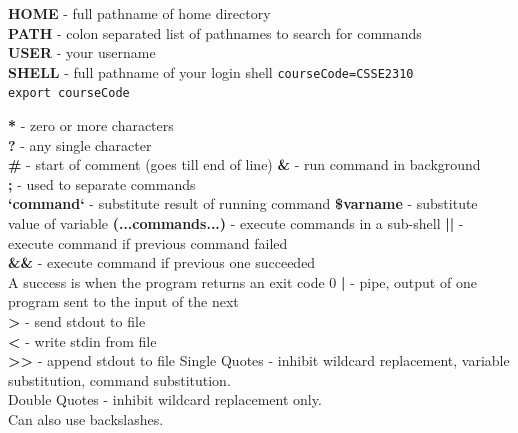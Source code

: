 \documentclass[number]{notes}
\begin{document}
\begin{landscape}
\begin{multicols}{3}
\textbf{HOME} - full pathname of home directory\\
\textbf{PATH} - colon separated list of pathnames to search for commands\\
\textbf{USER} - your username\\
\textbf{SHELL} - full pathname of your login shell
\texttt{courseCode=CSSE2310}\\
\texttt{export courseCode}

\textbf{*} - zero or more characters\\
\textbf{?} - any single character\\
\textbf{\#} - start of comment (goes till end of line)
\textbf{\&} - run command in background\\
\textbf{;} - used to separate commands\\
\textbf{`command`} - substitute result of running command
\textbf{\$varname} - substitute value of variable
\textbf{(...commands...)} - execute commands in a sub-shell
\textbf{||} - execute command if previous command failed\\
\textbf{\&\&} - execute command if previous one succeeded\\
A success is when the program returns an exit code 0
\textbf{|} - pipe, output of one program sent to the input of the next\\
\textbf{>} - send stdout to file\\
\textbf{<} - write stdin from file\\
\textbf{>>} - append stdout to file
Single Quotes - inhibit wildcard replacement, variable substitution, command substitution.\\
Double Quotes - inhibit wildcard replacement only.\\
Can also use backslashes.


\end{multicols}
\end{landscape}
\end{document}
